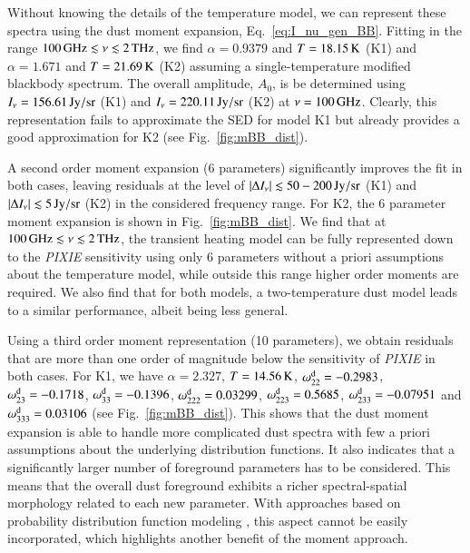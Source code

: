\documentclass[usenatbib]{mn2e}
\begin{document}
Without knowing the details of the temperature model, we can represent these spectra using the dust moment expansion, Eq.~\eqref{eq:I_nu_gen_BB}. Fitting in the range $100\,{\rm GHz}\lesssim \nu\lesssim 2\,{\rm THz}$, we find $\alpha=0.9379$ and $T=18.15\,{\rm K}$ (K1) and $\alpha=1.671$ and $T=21.69\,{\rm K}$ (K2) assuming a single-temperature modified blackbody spectrum. The overall amplitude, $A_0$, is be determined using $I_\nu=156.61\,{\rm Jy/sr}$ (K1) and $I_\nu=220.11\,{\rm Jy/sr}$ (K2) at $\nu=100\,{\rm GHz}$. Clearly, this representation fails to approximate the SED for model K1 but already provides a good approximation for K2 (see Fig.~\ref{fig:mBB_dist}).

A second order moment expansion (6 parameters) significantly improves the fit in both cases, leaving residuals at the level of $|\Delta I_\nu|\lesssim 50-200\,{\rm Jy/sr}$ (K1) and $|\Delta I_\nu|\lesssim 5\,{\rm Jy/sr}$ (K2) in the considered frequency range. For K2, the 6 parameter moment expansion is shown in Fig.~\ref{fig:mBB_dist}. We find that at $100\,{\rm GHz}\lesssim \nu\lesssim 2\,{\rm THz}$, the transient heating model can be fully represented down to the {\it PIXIE} sensitivity using only 6 parameters without a priori assumptions about the temperature model, while outside this range higher order moments are required. We also find that for both models, a two-temperature dust model leads to a similar performance, albeit being less general.

Using a third order moment representation (10 parameters), we obtain residuals that are more than one order of magnitude below the sensitivity of {\it PIXIE} in both cases. For K1, we have $\alpha=2.327$, $T=14.56\,{\rm K}$, $\omega^{\rm d}_{22}=-0.2983$, $\omega^{\rm d}_{23}=-0.1718$, $\omega^{\rm d}_{33}=-0.1396$, $\omega^{\rm d}_{222}=0.03299$, $\omega^{\rm d}_{223}=0.5685$, $\omega^{\rm d}_{233}=-0.07951$ and $\omega^{\rm d}_{333}=0.03106$ (see Fig.~\ref{fig:mBB_dist}). This shows that the dust moment expansion is able to handle more complicated dust spectra with few a priori assumptions about the underlying distribution functions. 
%
It also indicates that a significantly larger number of foreground parameters has to be considered. This means that the overall dust foreground exhibits a richer spectral-spatial morphology related to each new parameter. With approaches based on probability distribution function modeling \citep[e.g., see][for a recent example]{Jacques2017_3Ddust}, this aspect cannot be easily incorporated, which highlights another benefit of the moment approach.
\end{document}
